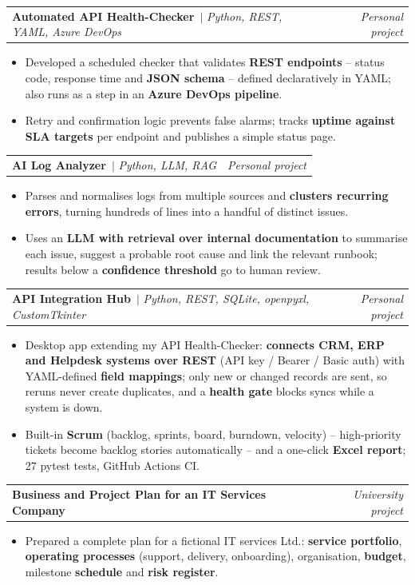 \documentclass[a4paper,11pt]{article}
\makeatletter
\newcommand{\resumeItem}[1]{\item\small{#1\vspace{-2pt}}}
\newcommand{\resumeProjectHeading}[2]{
  \item
    \begin{tabular*}{0.97\textwidth}{l@{\extracolsep{\fill}}r}
      \small #1 & \textit{\small\color{muted} #2} \\
    \end{tabular*}\vspace{-7pt}
}
\newcommand{\ghuser}{juanmiguelaasg}
\newcommand{\ghlink}[1]{\,\href{https://github.com/\ghuser/#1}{\faGithub}}
\newcommand{\resumeItemListStart}{\begin{itemize}[itemsep=1pt]}
\newcommand{\resumeItemListEnd}{\end{itemize}\vspace{-5pt}}
\makeatother
\begin{document}
    \resumeProjectHeading
      {\textbf{Automated API Health-Checker}\ghlink{api-health-checker} $|$ \emph{Python, REST, YAML, Azure DevOps}}{Personal project}
      \resumeItemListStart
        \resumeItem{Developed a scheduled checker that validates \textbf{REST endpoints} -- status code, response time and
          \textbf{JSON schema} -- defined declaratively in YAML; also runs as a step in an \textbf{Azure DevOps pipeline}.}
        \resumeItem{Retry and confirmation logic prevents false alarms; tracks \textbf{uptime against SLA targets} per endpoint and
          publishes a simple status page.}
      \resumeItemListEnd

    \resumeProjectHeading
      {\textbf{AI Log Analyzer}\ghlink{ai-log-analyzer} $|$ \emph{Python, LLM, RAG}}{Personal project}
      \resumeItemListStart
        \resumeItem{Parses and normalises logs from multiple sources and \textbf{clusters recurring errors}, turning hundreds of
          lines into a handful of distinct issues.}
        \resumeItem{Uses an \textbf{LLM with retrieval over internal documentation} to summarise each issue, suggest a probable
          root cause and link the relevant runbook; results below a \textbf{confidence threshold} go to human review.}
      \resumeItemListEnd

    \resumeProjectHeading
      {\textbf{API Integration Hub}\ghlink{api-integration-hub} $|$ \emph{Python, REST, SQLite, openpyxl, CustomTkinter}}{Personal project}
      \resumeItemListStart
        \resumeItem{Desktop app extending my API Health-Checker: \textbf{connects CRM, ERP and Helpdesk systems over REST}
          (API key / Bearer / Basic auth) with YAML-defined \textbf{field mappings}; only new or changed records are sent,
          so reruns never create duplicates, and a \textbf{health gate} blocks syncs while a system is down.}
        \resumeItem{Built-in \textbf{Scrum} (backlog, sprints, board, burndown, velocity) -- high-priority tickets become
          backlog stories automatically -- and a one-click \textbf{Excel report}; 27 pytest tests, GitHub Actions CI.}
      \resumeItemListEnd

    \resumeProjectHeading
      {\textbf{Business and Project Plan for an IT Services Company}}{University project}
      \resumeItemListStart
        \resumeItem{Prepared a complete plan for a fictional IT services Ltd.: \textbf{service portfolio}, \textbf{operating
          processes} (support, delivery, onboarding), organisation, \textbf{budget}, milestone \textbf{schedule} and
          \textbf{risk register}.}
      \resumeItemListEnd
\end{document}
